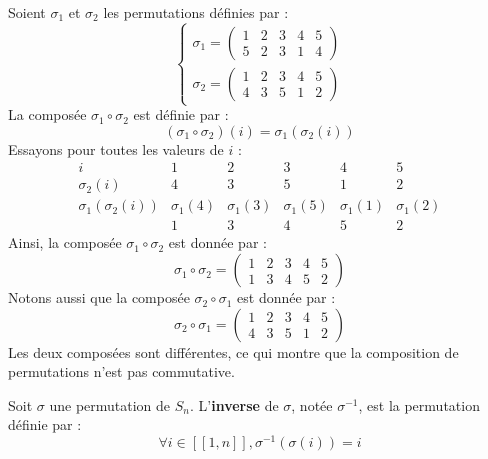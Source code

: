 \documentclass[11pt,a4paper]{report}
\begin{document}
\begin{example}
    Soient $\sigma_1$ et $\sigma_2$ les permutations définies par :
    $$
    \begin{cases}
        \sigma_1 = \left(\begin{matrix} 1 & 2 & 3 & 4 & 5 \\ 5 & 2 & 3 & 1 & 4 \end{matrix}\right) \\
        \sigma_2 = \left(\begin{matrix} 1 & 2 & 3 & 4 & 5 \\ 4 & 3 & 5 & 1 & 2 \end{matrix}\right)
    \end{cases}
    $$
    La composée $\sigma_1 \circ \sigma_2$ est définie par :
    $$
    (\sigma_1 \circ \sigma_2)(i) = \sigma_1(\sigma_2(i))
    $$
    Essayons pour toutes les valeurs de $i$ :
    \[
    \begin{array}{c|ccccc}
        i & 1 & 2 & 3 & 4 & 5 \\
        \hline
        \sigma_2(i) & 4 & 3 & 5 & 1 & 2 \\
        \sigma_1(\sigma_2(i)) & \sigma_1(4) & \sigma_1(3) & \sigma_1(5) & \sigma_1(1) & \sigma_1(2) \\
        & 1 & 3 & 4 & 5 & 2
    \end{array}
    \]
    Ainsi, la composée $\sigma_1 \circ \sigma_2$ est donnée par :
    $$
    \sigma_1 \circ \sigma_2 = \left(\begin{matrix} 1 & 2 & 3 & 4 & 5 \\ 1 & 3 & 4 & 5 & 2 \end{matrix}\right)
    $$
    Notons aussi que la composée $\sigma_2 \circ \sigma_1$ est donnée par :
    $$
    \sigma_2 \circ \sigma_1 = \left(\begin{matrix} 1 & 2 & 3 & 4 & 5 \\ 4 & 3 & 5 & 1 & 2 \end{matrix}\right)
    $$
    Les deux composées sont différentes, ce qui montre que la composition de permutations n'est pas commutative.
\end{example}

\begin{definition}
    Soit $\sigma$ une permutation de $S_n$. L'\textbf{inverse} de $\sigma$, notée $\sigma^{-1}$, est la permutation définie par :
    $$\forall i \in [\![1,n]\!], \sigma^{-1}(\sigma(i)) = i$$
\end{definition}
\end{document}
